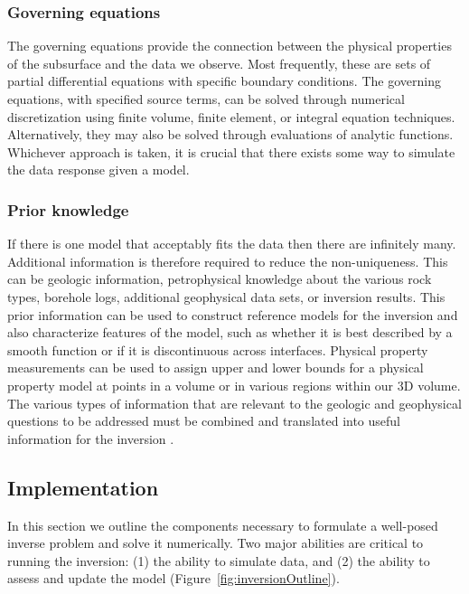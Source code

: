 \documentclass[preprint,review,3p,times,onecolumn,authoryear]{elsarticle}
\begin{document}
\subsubsection*{Governing equations}

The governing equations provide the connection between the physical properties
of the subsurface and the data we observe.
Most frequently, these are sets of partial differential equations with specific
boundary conditions.
The governing equations, with specified source terms,
can be solved through numerical discretization using
finite volume, finite element, or integral equation techniques.
Alternatively, they may also be solved
through evaluations of analytic functions.
Whichever approach is taken, it is crucial that there exists some way to
simulate the data response given a model.

\subsubsection*{Prior knowledge}

If there is one model that acceptably fits the data then there are
infinitely many. Additional information is therefore required to reduce the non-uniqueness.
This can be geologic information, petrophysical knowledge about the various rock types, borehole logs,
additional geophysical data sets, or inversion results. This prior information
can be used to construct reference models for the inversion and also
characterize features of the model, such as whether it is best described by a smooth function
or if it is discontinuous across interfaces. Physical property measurements
can be used to assign upper and lower bounds for a physical property model at
points in a volume or in various regions within our 3D volume.
The various types of information that are relevant to the geologic and
geophysical questions to be addressed must be combined
and translated into useful information for the inversion \citep{lelievre2009integrating,MaokunLi2010}.

\subsection{Implementation}

In this section we outline the components necessary to formulate a well-posed inverse problem and solve it
numerically.
Two major abilities are critical to running the inversion:
(1) the ability to simulate data, and
(2) the ability to assess and update the model (Figure~\ref{fig:inversionOutline}).
\end{document}
